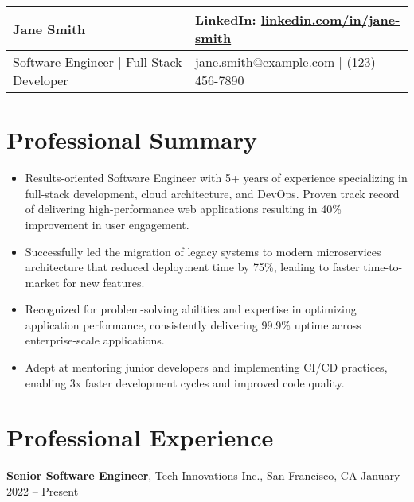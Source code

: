 \documentclass[a4paper,10pt]{article}
\begin{document}
\noindent

\begin{tabular}{@{}p{3.5in} p{3.5in}@{}}

    {\bfseries\LARGE Jane Smith} & \hfill LinkedIn: \href{https://www.linkedin.com/in/jane-smith/}{linkedin.com/in/jane-smith} \\
    
    \hline 
    
    Software Engineer | Full Stack Developer & \hfill jane.smith@example.com | (123) 456-7890
\end{tabular}

\section*{Professional Summary}

\begin{itemize}
    \item Results-oriented Software Engineer with 5+ years of experience specializing in full-stack development, cloud architecture, and DevOps. Proven track record of delivering high-performance web applications resulting in 40\% improvement in user engagement.
    
    \item Successfully led the migration of legacy systems to modern microservices architecture that reduced deployment time by 75\%, leading to faster time-to-market for new features.
    
    \item Recognized for problem-solving abilities and expertise in optimizing application performance, consistently delivering 99.9\% uptime across enterprise-scale applications.
    
    \item Adept at mentoring junior developers and implementing CI/CD practices, enabling 3x faster development cycles and improved code quality.
\end{itemize}

\section*{Professional Experience}

\vspace{4pt}
{\bfseries Senior Software Engineer}, Tech Innovations Inc., San Francisco, CA \hfill January 2022 -- Present
\end{document}
